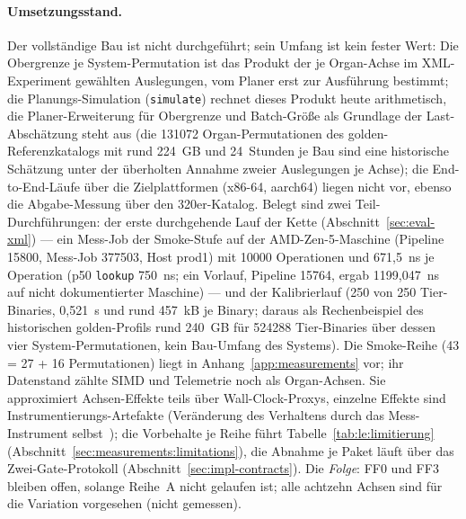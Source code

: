 \begin{nurkurz}
\paragraph{Umsetzungsstand.} Der vollständige Bau ist nicht durchgeführt; sein Umfang ist kein fester
Wert: Die Obergrenze je System-Permutation ist das Produkt der je Organ-Achse im XML-Experiment gewählten
Auslegungen, vom Planer erst zur Ausführung bestimmt; die Planungs-Simulation (\texttt{simulate}) rechnet
dieses Produkt heute arithmetisch, die Planer-Erweiterung für Obergrenze und Batch-Größe als Grundlage der
Last-Abschätzung steht aus (die 131072 Organ-Permutationen des golden-Referenzkatalogs mit rund 224~GB und
24~Stunden je Bau sind eine historische Schätzung unter der überholten Annahme zweier Auslegungen je Achse); die End-to-End-Läufe über die Zielplattformen (x86-64, aarch64)
liegen nicht vor, ebenso die Abgabe-Messung über den 320er-Katalog.
Belegt sind zwei Teil-Durchführungen: der erste durchgehende Lauf der Kette (Abschnitt~\ref{sec:eval-xml})
--- ein Mess-Job der Smoke-Stufe auf der AMD-Zen-5-Maschine (Pipeline 15800, Mess-Job 377503, Host prod1)
mit 10000 Operationen und 671,5~ns je Operation (p50 \texttt{lookup} 750~ns; ein Vorlauf, Pipeline 15764,
ergab 1199,047~ns auf nicht dokumentierter Maschine) --- und der Kalibrierlauf (250 von 250 Tier-Binaries,
0,521~s und rund 457~kB je Binary; daraus als Rechenbeispiel des historischen golden-Profils rund 240~GB für 524288 Tier-Binaries
über dessen vier System-Permutationen, kein Bau-Umfang des Systems). Die Smoke-Reihe (43 = 27 + 16 Permutationen) liegt in
Anhang~\ref{app:measurements} vor; ihr Datenstand zählte SIMD und Telemetrie noch als Organ-Achsen. Sie
approximiert Achsen-Effekte teils über Wall-Clock-Proxys, einzelne Effekte sind
Instrumentierungs-Artefakte (Veränderung des Verhaltens durch das Mess-Instrument
selbst~\cite{gait1986probe}); die Vorbehalte je Reihe führt
Tabelle~\ref{tab:le:limitierung} (Abschnitt~\ref{sec:measurements:limitations}), die Abnahme je Paket läuft
über das Zwei-Gate-Protokoll (Abschnitt~\ref{sec:impl-contracts}). Die \emph{Folge}: FF0 und
FF3 bleiben offen, solange Reihe~A nicht gelaufen ist; alle achtzehn Achsen sind für die Variation
vorgesehen (nicht gemessen).
\end{nurkurz}

